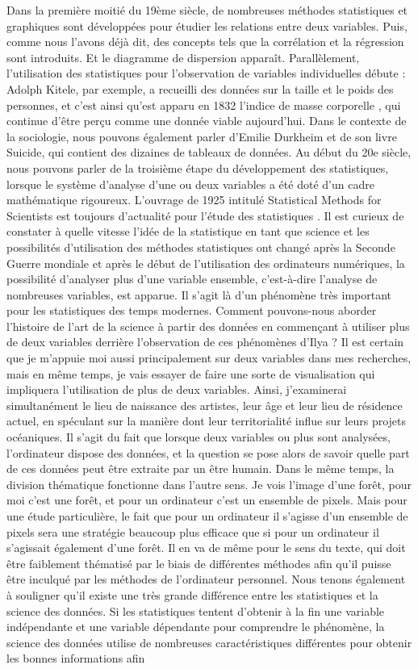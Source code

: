 \documentclass[a4paper, twoside, 12pt]{book}
\begin{document}
Dans la première moitié du 19ème siècle, de nombreuses méthodes statistiques et graphiques sont développées pour étudier les relations entre deux variables. Puis, comme nous l'avons déjà dit, des concepts tels que la corrélation et la régression sont introduits. Et le diagramme de dispersion apparaît. Parallèlement, l'utilisation des statistiques pour l'observation de variables individuelles débute : Adolph Kitele, par exemple, a recueilli des données sur la taille et le poids des personnes, et c'est ainsi qu'est apparu en 1832 l'indice de masse corporelle , qui continue d'être perçu comme une donnée viable aujourd'hui. Dans le contexte de la sociologie, nous pouvons également parler d'Emilie Durkheim et de son livre Suicide, qui contient des dizaines de tableaux de données. Au début du 20e siècle, nous pouvons parler de la troisième étape du développement des statistiques, lorsque le système d'analyse d'une ou deux variables a été doté d'un cadre mathématique rigoureux. L'ouvrage de 1925 intitulé Statistical Methods for Scientists est toujours d'actualité pour l'étude des statistiques . Il est curieux de constater à quelle vitesse l'idée de la statistique en tant que science et les possibilités d'utilisation des méthodes statistiques ont changé après la Seconde Guerre mondiale et après le début de l'utilisation des ordinateurs numériques, la possibilité d'analyser plus d'une variable ensemble, c'est-à-dire l'analyse de nombreuses variables, est apparue. Il s'agit là d'un phénomène très important pour les statistiques des temps modernes. Comment pouvons-nous aborder l'histoire de l'art de la science à partir des données en commençant à utiliser plus de deux variables derrière l'observation de ces phénomènes d'Ilya ? Il est certain que je m'appuie moi aussi principalement sur deux variables dans mes recherches, mais en même temps, je vais essayer de faire une sorte de visualisation qui impliquera l'utilisation de plus de deux variables. Ainsi, j'examinerai simultanément le lieu de naissance des artistes, leur âge et leur lieu de résidence actuel, en spéculant sur la manière dont leur territorialité influe sur leurs projets océaniques. Il s'agit du fait que lorsque deux variables ou plus sont analysées, l'ordinateur dispose des données, et la question se pose alors de savoir quelle part de ces données peut être extraite par un être humain. Dans le même temps, la division thématique fonctionne dans l'autre sens. Je vois l'image d'une forêt, pour moi c'est une forêt, et pour un ordinateur c'est un ensemble de pixels. Mais pour une étude particulière, le fait que pour un ordinateur il s'agisse d'un ensemble de pixels sera une stratégie beaucoup plus efficace que si pour un ordinateur il s'agissait également d'une forêt. Il en va de même pour le sens du texte, qui doit être faiblement thématisé par le biais de différentes méthodes afin qu'il puisse être inculqué par les méthodes de l'ordinateur personnel. Nous tenons également à souligner qu'il existe une très grande différence entre les statistiques et la science des données. Si les statistiques tentent d'obtenir à la fin une variable indépendante et une variable dépendante pour comprendre le phénomène, la science des données utilise de nombreuses caractéristiques différentes pour obtenir les bonnes informations afin 
\end{document}

